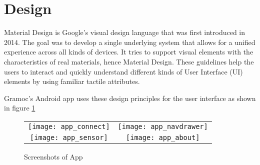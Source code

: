 \section{Design}

Material Design is Google's visual design language that was first introduced in 2014. The goal was to develop a single underlying system that allows for a unified experience across all kinds of devices. It tries to support visual elements with the characteristics of real materials, hence Material Design. These guidelines help the users to interact and quickly understand different kinds of User Interface (UI) elements by using familiar tactile attributes.

Gramoc's Android app uses these design principles for the user interface as shown in figure \ref{fig:appscreenshots}

\begin{figure}[H]
	\centering
	\begin{tabular}{cc}
	\texttt{[image: app\_connect]}
	&
	\texttt{[image: app\_navdrawer]}
	\\
	\texttt{[image: app\_sensor]}
	&
	\texttt{[image: app\_about]}
	\end{tabular}
	\caption{Screenshots of App}
	\label{fig:appscreenshots}
\end{figure}
